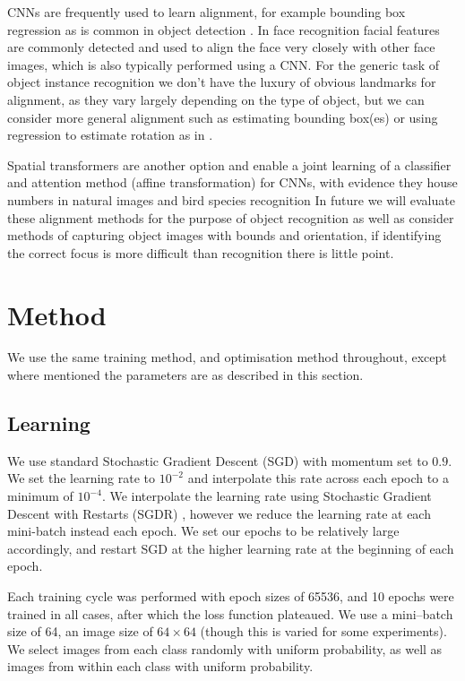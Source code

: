 CNNs are frequently used to learn alignment, for example bounding box regression as is common in object detection \cite{Sermanet2013}. In face recognition facial features are commonly detected and used to align the face very closely with other face images, which is also typically performed using a CNN. For the generic task of object instance recognition we don't have the luxury of obvious landmarks for alignment, as they vary largely depending on the type of object, but we can consider more general alignment such as estimating bounding box(es) or using regression to estimate rotation as in \cite {Fischer2015}. 

Spatial transformers \cite{Jaderberg2015a} are another option and enable a joint learning of a classifier and attention method (affine transformation) for CNNs, with evidence they  house numbers in natural images \cite{Netzer2011} and bird species recognition \cite{Wah2011} In future we will evaluate these alignment methods for the purpose of object recognition as well as consider methods of capturing object images with bounds and orientation, if identifying the correct focus is more difficult than recognition there is little point.


\section{Method}

We use the same training method, and optimisation method throughout, except where mentioned the parameters are as described in this section. 

\subsection {Learning}

We use standard Stochastic Gradient Descent (SGD) with momentum set to $ 0.9 $. We set the learning rate to $ 10^{-2} $ and interpolate this rate across each epoch to a minimum of $ 10^{-4} $. We interpolate the learning rate using Stochastic Gradient Descent with Restarts (SGDR) \cite{Loshchilov2016}, however we reduce the learning rate at each mini-batch instead each epoch. We set our epochs to be relatively large accordingly, and restart SGD at the higher learning rate at the beginning of each epoch. 

Each training cycle was performed with epoch sizes of 65536, and 10 epochs were trained in all cases, after which the loss function plateaued. We use a mini--batch size of 64, an image size of $64\times64$ (though this is varied for some experiments). We select images from each class randomly with uniform probability, as well as images from within each class with uniform probability.


